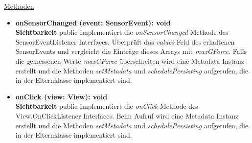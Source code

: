 \underline{Methoden}
\begin{itemize}
\itemsep0pt

\item \textbf{onSensorChanged (event: SensorEvent): void}\hfill\\
\textbf{Sichtbarkeit} public\newline
Implementiert die \textit{onSensorChanged} Methode des SensorEventListener Interfaces. Überprüft das \textit{values} Feld des erhaltenen SensorEvents und vergleicht die Einträge dieses Arrays mit \textit{maxGForce}. Falls die gemessenen Werte \textit{maxGForce} überschreiten wird eine Metadata Instanz erstellt und die Methoden \textit{setMetadata} und \textit{schedulePersisting} aufgerufen, die in der Elternklasse implementiert sind.

\item \textbf{onClick (view: View): void}\hfill\\
\textbf{Sichtbarkeit} public\newline
Implementiert die \textit{onClick} Methode des View.OnClickListener Interfaces. Beim Aufruf wird eine Metadata Instanz erstellt und die Methoden \textit{setMetadata} und \textit{schedulePersisting} aufgerufen, die in der Elternklasse implementiert sind.

\end{itemize}